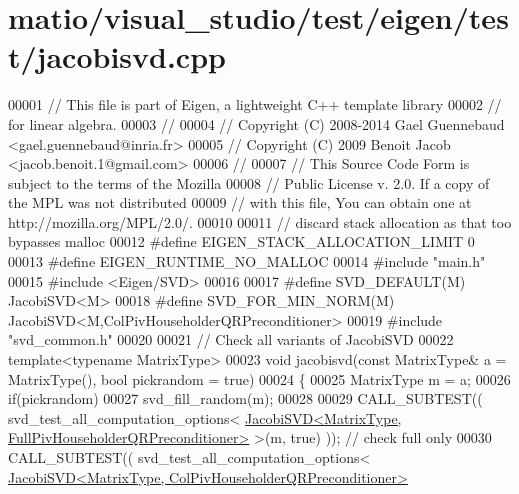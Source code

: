 \hypertarget{matio_2visual__studio_2test_2eigen_2test_2jacobisvd_8cpp_source}{}\section{matio/visual\+\_\+studio/test/eigen/test/jacobisvd.cpp}
\label{matio_2visual__studio_2test_2eigen_2test_2jacobisvd_8cpp_source}

\begin{DoxyCode}
00001 \textcolor{comment}{// This file is part of Eigen, a lightweight C++ template library}
00002 \textcolor{comment}{// for linear algebra.}
00003 \textcolor{comment}{//}
00004 \textcolor{comment}{// Copyright (C) 2008-2014 Gael Guennebaud <gael.guennebaud@inria.fr>}
00005 \textcolor{comment}{// Copyright (C) 2009 Benoit Jacob <jacob.benoit.1@gmail.com>}
00006 \textcolor{comment}{//}
00007 \textcolor{comment}{// This Source Code Form is subject to the terms of the Mozilla}
00008 \textcolor{comment}{// Public License v. 2.0. If a copy of the MPL was not distributed}
00009 \textcolor{comment}{// with this file, You can obtain one at http://mozilla.org/MPL/2.0/.}
00010 
00011 \textcolor{comment}{// discard stack allocation as that too bypasses malloc}
00012 \textcolor{preprocessor}{#define EIGEN\_STACK\_ALLOCATION\_LIMIT 0}
00013 \textcolor{preprocessor}{#define EIGEN\_RUNTIME\_NO\_MALLOC}
00014 \textcolor{preprocessor}{#include "main.h"}
00015 \textcolor{preprocessor}{#include <Eigen/SVD>}
00016 
00017 \textcolor{preprocessor}{#define SVD\_DEFAULT(M) JacobiSVD<M>}
00018 \textcolor{preprocessor}{#define SVD\_FOR\_MIN\_NORM(M) JacobiSVD<M,ColPivHouseholderQRPreconditioner>}
00019 \textcolor{preprocessor}{#include "svd\_common.h"}
00020 
00021 \textcolor{comment}{// Check all variants of JacobiSVD}
00022 \textcolor{keyword}{template}<\textcolor{keyword}{typename} MatrixType>
00023 \textcolor{keywordtype}{void} jacobisvd(\textcolor{keyword}{const} MatrixType& a = MatrixType(), \textcolor{keywordtype}{bool} pickrandom = \textcolor{keyword}{true})
00024 \{
00025   MatrixType m = a;
00026   \textcolor{keywordflow}{if}(pickrandom)
00027     svd\_fill\_random(m);
00028 
00029   CALL\_SUBTEST(( svd\_test\_all\_computation\_options<
      \hyperlink{group___s_v_d___module_class_eigen_1_1_jacobi_s_v_d}{JacobiSVD<MatrixType, FullPivHouseholderQRPreconditioner>}
       >(m, \textcolor{keyword}{true})  )); \textcolor{comment}{// check full only}
00030   CALL\_SUBTEST(( svd\_test\_all\_computation\_options<
      \hyperlink{group___s_v_d___module_class_eigen_1_1_jacobi_s_v_d}{JacobiSVD<MatrixType, ColPivHouseholderQRPreconditioner>}

\end{DoxyCode}
